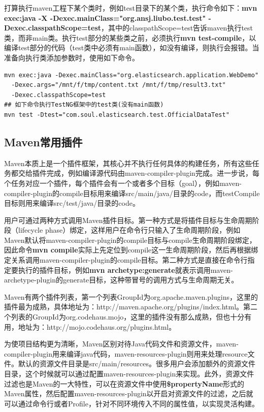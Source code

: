\par 打算执行maven工程下某个类时，例如test目录下的某个类，执行命令如下：\textbf{mvn exec:java -X -Dexec.mainClass="org.ansj.liubo.test.test"  -Dexec.classpathScope=test}，其中的classpathScope=test告诉maven执行test类，而非main类。执行test部分的某些类之前，必须执行\textbf{mvn test-compile}，以编译test部分的代码（test类中必须有main函数），如没有编译，则执行会报错。当准备向执行类添加参数时，使用如下命令。
\begin{verbatim}
mvn exec:java -Dexec.mainClass="org.elasticsearch.application.WebDemo"
  -Dexec.args="/mnt/f/tmp/content.txt /mnt/f/tmp/result3.txt"  
  -Dexec.classpathScope=test
## 如下命令执行TestNG框架中的test类(没有main函数)
mvn test -Dtest="com.soul.elasticsearch.test.OfficialDataTest"
\end{verbatim}
\subsection{Maven常用插件}
\par Maven本质上是一个插件框架，其核心并不执行任何具体的构建任务，所有这些任务都交给插件完成，例如编译源代码由maven-compiler-plugin完成。进一步说，每个任务对应一个插件，每个插件会有一个或者多个目标（goal），例如maven-compiler-plugin的compile目标用来编译src/main/java/目录的code，而testCompile目标则用来编译src/test/java/目录的code。
\par 用户可通过两种方式调用Maven插件目标。第一种方式是将插件目标与生命周期阶段（lifecycle phase）绑定，这样用户在命令行只输入了生命周期阶段，例如Maven默认将maven-compiler-plugin的compile目标与compile生命周期阶段绑定，因此命令\textbf{mvn compile}实际上先定位到compile这一生命周期阶段，然后再根据绑定关系调用maven-compiler-plugin的compile目标。第二种方式是直接在命令行指定要执行的插件目标，例如\textbf{mvn archetype:generate}就表示调用maven-archetype-plugin的generate目标，这种带冒号的调用方式与生命周期无关。
\par Maven有两个插件列表，第一个列表GroupId为org.apache.maven.plugins，这里的插件最为成熟，具体地址为：http://maven.apache.org/plugins/index.html。第二个列表的GroupId为org.codehaus.mojo，这里的插件没有那么成熟，但也十分有用，地址为：http://mojo.codehaus.org/plugins.html。
\par 为使项目结构更为清晰，Maven区别对待Java代码文件和资源文件，maven-compiler-plugin用来编译java代码，maven-resources-plugin则用来处理resource文件。默认的资源文件目录是src/main/resources。很多用户会添加额外的资源文件目录，这个时候就可以通过配置maven-resources-plugin来实现。此外，资源文件过滤也是Maven的一大特性，可以在资源文件中使用\textbf{\${propertyName}}形式的Maven属性，然后配置maven-resources-plugin以开启对资源文件的过滤，之后就可以通过命令行或者Profile，针对不同环境传入不同的属性值，以实现灵活构建。
